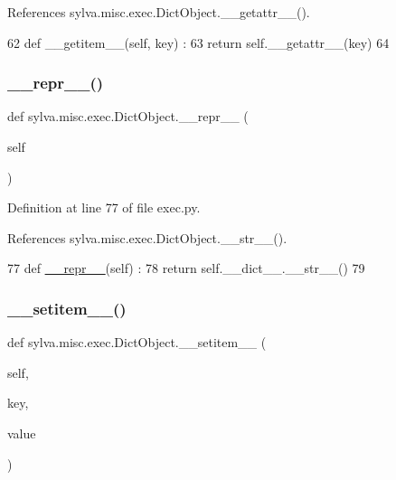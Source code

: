References sylva.\+misc.\+exec.\+Dict\+Object.\+\_\+\+\_\+getattr\+\_\+\+\_\+().


\begin{DoxyCode}
62   \textcolor{keyword}{def }\_\_getitem\_\_(self, key) :
63     \textcolor{keywordflow}{return} self.\_\_getattr\_\_(key)
64 
\end{DoxyCode}
\mbox{\label{classsylva_1_1misc_1_1exec_1_1_dict_object_a50fd48db155e090c3fb26a50e2999a95}} 
\subsubsection{\texorpdfstring{\+\_\+\+\_\+repr\+\_\+\+\_\+()}{\_\_repr\_\_()}}
{\footnotesize\ttfamily def sylva.\+misc.\+exec.\+Dict\+Object.\+\_\+\+\_\+repr\+\_\+\+\_\+ (\begin{DoxyParamCaption}\item[{}]{self }\end{DoxyParamCaption})}



Definition at line 77 of file exec.\+py.



References sylva.\+misc.\+exec.\+Dict\+Object.\+\_\+\+\_\+str\+\_\+\+\_\+().


\begin{DoxyCode}
77   \textcolor{keyword}{def }\hyperlink{namespacesylva_1_1code__generation_1_1floorplanner_a84f24b1e40f5425e9bb40ab45ccbd10f}{\_\_repr\_\_}(self) :
78     \textcolor{keywordflow}{return} self.\_\_dict\_\_.\_\_str\_\_()
79 
\end{DoxyCode}
\mbox{\label{classsylva_1_1misc_1_1exec_1_1_dict_object_a219a0c8ab7c1f0a05a76c5c79f86fe59}} 
\subsubsection{\texorpdfstring{\+\_\+\+\_\+setitem\+\_\+\+\_\+()}{\_\_setitem\_\_()}}
{\footnotesize\ttfamily def sylva.\+misc.\+exec.\+Dict\+Object.\+\_\+\+\_\+setitem\+\_\+\+\_\+ (\begin{DoxyParamCaption}\item[{}]{self,  }\item[{}]{key,  }\item[{}]{value }\end{DoxyParamCaption})}



